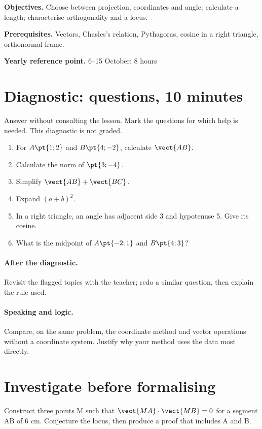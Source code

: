\label{C03}
\begin{keypoint}
\textbf{Objectives.} Choose between projection, coordinates and angle; calculate a length; characterise orthogonality and a locus.

\textbf{Prerequisites.} Vectors, Chasles's relation, Pythagoras, cosine in a right triangle, orthonormal frame.

\textbf{Yearly reference point.} 6--15 October: 8 hours\end{keypoint}
\section*{Diagnostic:  questions, 10 minutes}\label{C03-D}
Answer without consulting the lesson. Mark the questions for which help is needed. This diagnostic is not graded.
\begin{enumerate}
\item For $A\pt{1;2}$ and $B\pt{4;-2}$, calculate $\vect{AB}$.
\item Calculate the norm of $\pt{3;-4}$.
\item Simplify $\vect{AB}+\vect{BC}$.
\item Expand $(a+b)^2$.
\item In a right triangle, an angle has adjacent side 3 and hypotenuse 5. Give its cosine.
\item What is the midpoint of $A\pt{-2;1}$ and $B\pt{4;3}$?
\end{enumerate}
\paragraph{After the diagnostic.} Revisit the flagged topics with the teacher; redo a similar question, then explain the rule used.
\paragraph{Speaking and logic.} Compare, on the same problem, the coordinate method and vector operations without a coordinate system. Justify why your method uses the data most directly.
\mxnewpage
\section*{Investigate before formalising}\label{C03-RECH}
Construct three points M such that $\vect{MA}\cdot\vect{MB}=0$ for a segment AB of 6 cm. Conjecture the locus, then produce a proof that includes A and B.
